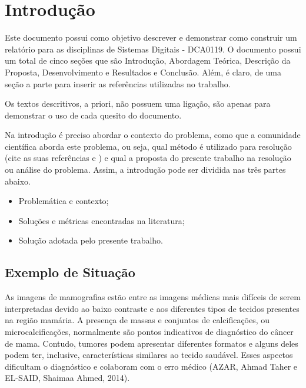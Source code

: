\documentclass[
	12pt,				%
	openright,			%
	oneside,			%
	a4paper,			%
	brazil,				%
	]{abntex2}
\author{Discentes:\\\hspace{2cm}Sicrano\\\hspace{2cm}Beltrano\\\hspace{2cm}Fulano\\}
\date{08 de março de 2019}
\begin{document}
\frenchspacing 

\imprimircapa

\tableofcontents*
\cleardoublepage



\textual

\chapter{Introdução}

Este documento possui como objetivo descrever e demonstrar como construir um relatório para as disciplinas de Sistemas Digitais - DCA0119. O documento possui um total de cinco seções que são Introdução, Abordagem Teórica, Descrição da Proposta, Desenvolvimento e Resultados e Conclusão. Além, é claro, de uma seção a parte para inserir as referências utilizadas no trabalho.

Os textos descritivos, a priori, não possuem uma ligação, são apenas para demonstrar o uso de cada quesito do documento.

Na introdução é preciso abordar o contexto do problema, como que a comunidade científica aborda este problema, ou seja, qual método é utilizado para resolução (cite as suas referências \cite{notasaula1} e \cite{notasaula2} ) e qual a proposta do presente trabalho na resolução ou análise do problema. Assim, a introdução pode ser dividida nas três partes abaixo.
\begin{itemize}
    \item Problemática e contexto;
    \item Soluções e métricas encontradas na literatura;
    \item Solução adotada pelo presente trabalho.
\end{itemize}

\section{Exemplo de Situação}
    As imagens de mamografias estão entre as imagens médicas mais difíceis de serem interpretadas devido ao baixo contraste e aos diferentes tipos de tecidos presentes na região mamária. A presença de massas e conjuntos de calcificações, ou microcalcificações, normalmente são pontos indicativos de diagnóstico do câncer de mama. Contudo, tumores podem apresentar diferentes formatos e alguns deles podem ter, inclusive, características similares ao tecido saudável. Esses aspectos dificultam o diagnóstico e colaboram com o erro médico (AZAR, Ahmad Taher e EL-SAID, Shaimaa Ahmed, 2014). 
    
\end{document}

